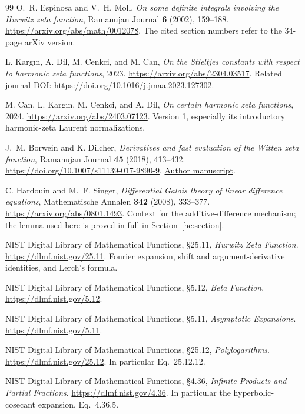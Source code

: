 \begin{thebibliography}{99}
O.~R. Espinosa and V.~H. Moll,
\emph{On some definite integrals involving the Hurwitz zeta function},
Ramanujan Journal \textbf{6} (2002), 159--188.
\url{https://arxiv.org/abs/math/0012078}.
The cited section numbers refer to the 34-page arXiv version.

L. Karg\i n, A. Dil, M. Cenkci, and M. Can,
\emph{On the Stieltjes constants with respect to harmonic zeta functions},
2023. \url{https://arxiv.org/abs/2304.03517}.
Related journal DOI: \url{https://doi.org/10.1016/j.jmaa.2023.127302}.

M. Can, L. Karg\i n, M. Cenkci, and A. Dil,
\emph{On certain harmonic zeta functions}, 2024.
\url{https://arxiv.org/abs/2403.07123}.
Version 1, especially its introductory harmonic-zeta Laurent
normalizations.

J.~M. Borwein and K. Dilcher,
\emph{Derivatives and fast evaluation of the Witten zeta function},
Ramanujan Journal \textbf{45} (2018), 413--432.
\url{https://doi.org/10.1007/s11139-017-9890-9}.
\href{https://carmamaths.org/resources/jon/omega3.pdf}{Author manuscript}.

C. Hardouin and M.~F. Singer,
\emph{Differential Galois theory of linear difference equations},
Mathematische Annalen \textbf{342} (2008), 333--377.
\url{https://arxiv.org/abs/0801.1493}.
Context for the additive-difference mechanism; the lemma used here is
proved in full in Section~\ref{hc:section}.

NIST Digital Library of Mathematical Functions,
\S25.11, \emph{Hurwitz Zeta Function}.
\url{https://dlmf.nist.gov/25.11}.
Fourier expansion, shift and argument-derivative identities, and
Lerch's formula.

NIST Digital Library of Mathematical Functions,
\S5.12, \emph{Beta Function}.
\url{https://dlmf.nist.gov/5.12}.

NIST Digital Library of Mathematical Functions,
\S5.11, \emph{Asymptotic Expansions}.
\url{https://dlmf.nist.gov/5.11}.

NIST Digital Library of Mathematical Functions,
\S25.12, \emph{Polylogarithms}.
\url{https://dlmf.nist.gov/25.12}.
In particular Eq.~25.12.12.

NIST Digital Library of Mathematical Functions,
\S4.36, \emph{Infinite Products and Partial Fractions}.
\url{https://dlmf.nist.gov/4.36}.
In particular the hyperbolic-cosecant expansion, Eq.~4.36.5.

\end{thebibliography}
